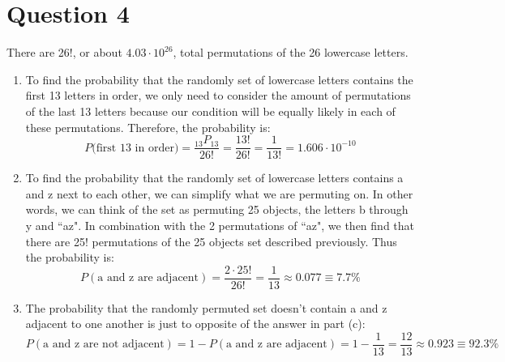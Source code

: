 \documentclass[letterpaper, 12pt]{article}
\begin{document}
\section*{Question 4}
There are 26!, or about $4.03 \cdot 10^{26}$, total permutations of the 26 lowercase letters.

\begin{enumerate}
    \item To find the probability that the randomly set of lowercase letters contains the first 13 letters in order, we only need to consider the amount of permutations of the last 13 letters because our condition will be equally likely in each of these permutations. Therefore, the probability is:
    \[P(\text{first 13 in order)} = \frac{_{13}P_{13}}{26!} = \frac{13!}{26!} = \frac{1}{13!} = 1.606 \cdot 10^{-10}\]
    
    \item To find the probability that the randomly set of lowercase letters contains a and z next to each other, we can simplify what we are permuting on. In other words, we can think of the set as permuting 25 objects, the letters b through y and ``az". In combination with the 2 permutations of ``az", we then find that there are 25! permutations of the 25 objects set described previously. Thus the probability is:
    \[P(\text{a and z are adjacent}) = \frac{2 \cdot 25!}{26!} = \frac{1}{13} \approx 0.077 \equiv 7.7\%\]
    
    \item The probability that the randomly permuted set doesn't contain a and z adjacent to one another is just to opposite of the answer in part (c):
    \[P(\text{a and z are not adjacent}) = 1 - P(\text{a and z are adjacent}) = 1 - \frac{1}{13} = \frac{12}{13} \approx 0.923 \equiv 92.3\%\]
\end{enumerate}
\end{document}
